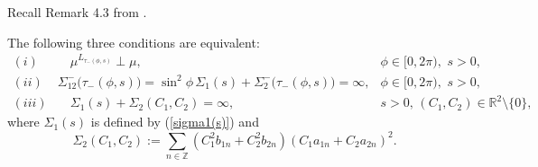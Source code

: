 \documentclass[preprint,12pt]{elsarticle}
\numberwithin{equation}{section}
\begin{document}
Recall Remark 4.3 from \cite{KosJFA17}.
\begin{rem}
\label{perp2-1} The following three conditions are equivalent:
\begin{eqnarray*}
(i)&\quad\mu^{L_{\tau_-(\phi,s)}}\perp\mu,&\phi\in[0,2\pi),\,\,s>0,\\
(ii)&\Sigma_{12}^-\big(\tau_{-}(\phi,\!s)\big)\!=\!\sin^2\phi\,\Sigma_1(s)\!+\!\Sigma^-_2\big(\tau_{-}(\phi,s)\big)\!=\!
\infty,&\phi\in[0,2\pi),\,\,s>0,\\
(iii)&\quad\Sigma_1(s)+\Sigma_2(C_1,C_2)=\infty,&s\!>\!0,\,(C_1,C_2)\!\in\!{\mathbb R}^2\!\setminus\!\{0\},
\end{eqnarray*}
where $\Sigma_1(s)$ is defined by (\ref{sigma1(s)}) and
\begin{equation}
\label{sigma_2(C,C)} 
\Sigma_2(C_1,C_2):=
\sum_{n\in {\mathbb Z}}(C_1^2b_{1n}+C_2^2b_{2n})(C_1a_{1n}+C_2a_{2n})^2.
\end{equation}
\end{rem}
\end{document}
